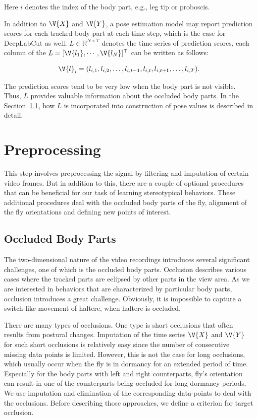 Here $i$ denotes the index of the body part, e.g., leg tip or proboscis.

In addition to $\V{X}$ and $\V{Y}$, a pose estimation model may report prediction scores for each tracked body part at each time step, which is the case for DeepLabCut as well.
$L \in \mathbb{R}^{N \times T}$ denotes the time series of prediction scores, each column of the $L=[\V{l_1}, \cdots, \V{l_N}]^\top$ can be written as follows:

\begin{equation}
	\V{l}_i = (l_{i,1}, l_{i,2}, \dots, l_{i,t-1}, l_{i,t}, l_{i,t+1}, \dots, l_{i,T}).
\end{equation}

The prediction scores tend to be very low when the body part is not visible.
Thus, $L$ provides valuable information about the occluded body parts.
In the Section~\ref{section:dealing-with-occluded-body-parts}, how $L$ is incorporated into construction of pose values is described in detail.

\section{Preprocessing}
This step involves preprocessing the signal by filtering and imputation of certain video frames.
But in addition to this, there are a couple of optional procedures that can be beneficial for our task of learning stereotypical behaviors.
These additional procedures deal with the occluded body parts of the fly, alignment of the fly orientations and defining new points of interest.

\subsection{Occluded Body Parts}\label{section:dealing-with-occluded-body-parts}
The two-dimensional nature of the video recordings introduces several significant challenges,  one of which is the occluded body parts.
Occlusion describes various cases where the tracked parts are eclipsed by other parts in the view area.
As we are interested in behaviors that are characterized by particular body parts, occlusion introduces a great challenge.
Obviously, it is impossible to capture a switch-like movement of haltere, when haltere is occluded.

There are many types of occlusions.
One type is short occlusions that often results from postural changes.
Imputation of the time series $\V{X}$ and $\V{Y}$ for such short occlusions is relatively easy since the number of consecutive missing data points is limited.
However, this is not the case for long occlusions, which usually occur when the fly is in dormancy for an extended period of time.
Especially for the body parts with left and right counterparts, fly's orientation can result in one of the counterparts being occluded for long dormancy periods.
We use imputation and elimination of the corresponding data-points to deal with the occlusions.
Before describing those approaches, we define a criterion for target occlusion.

